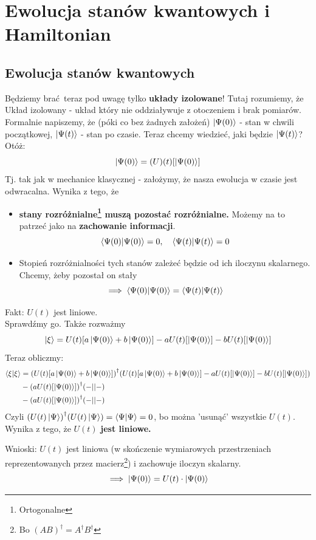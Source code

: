\documentclass[12pt,a4paper]{report}
\newcommand{\ind}[1]{{\color{blue} #1\index{#1}}}
\newcommand{\psket}[1]{\ket{\Psi(#1)}}
\renewcommand{\emph}{\textbf}
\newenvironment{lecture}[1]{\par\medskip
   \noindent\chapter{#1} \rmfamily}{\medskip}
\begin{document}
\begin{lecture}{Ewolucja stanów kwantowych i Hamiltonian}
\section{Ewolucja stanów kwantowych}
Będziemy brać teraz pod uwagę tylko \emph{układy izolowane}! Tutaj rozumiemy, że \ind{Układ izolowany} - układ który nie oddziaływuje z otoczeniem i brak pomiarów.\\
Formalnie napiszemy, że (póki co bez żadnych założeń) $\ket{\Psi(0)}$ - stan w chwili początkowej, $\ket{\Psi(t)}$ - stan po czasie. Teraz chcemy wiedzieć, jaki będzie $\ket{\Psi(t)}$?
Otóż:
\[
    \ket{\Psi(0)} = \mathcal(U)(t)\qty[\ket{\Psi(0)}]
\]
Tj. tak jak w mechanice klasycznej - założymy, że nasza ewolucja w czasie jest odwracalna. Wynika z tego, że 
\begin{itemize}
    \item \emph{stany rozróżnialne\footnote{Ortogonalne} muszą pozostać rozróżnialne.} Możemy na to patrzeć jako na \emph{zachowanie informacji}.
    \[
        \braket{\Psi(0)} = 0 \qc \braket{\Psi(t)} = 0
    \]
    \item Stopień rozróżnialności tych stanów zależeć będzie od ich iloczynu skalarnego. Chcemy, żeby pozostał on stały $$\implies \braket{\Psi(0)} = \braket{\Psi(t)}$$
\end{itemize}

{\color{teal} Fakt}: $U(t)$ jest liniowe.\\
Sprawdźmy go. Także rozważmy $$\ket{\xi} = U(t)\qty[a \ket{\Psi(0)} + b \ket{\Psi(0)}] - a U(t)\qty[\ket{\Psi(0)}] - b U(t)\qty[\ket{\Psi(0)}]$$
Teraz obliczmy:
\begin{align*}
    \braket{\xi} &= \qty(U(t) \qty[a \psket{0} + b \psket{0}])^\dagger \qty( U(t) \qty[a \ket{\Psi(0)} + b \ket{\Psi(0)}] - a U(t) \qty[\ket{\Psi(0)}] - b U(t) \qty[\ket{\Psi(0)}])\\
    &- \qty(a U(t) \qty[\psket{0}])^\dagger \qty(-||-)\\
    &- \qty(a U(t) \qty[\psket{0}])^\dagger \qty(-||-)
\end{align*}
Czyli $\qty(U(t)\ket{\Psi})^\dagger (U(t) \ket{\Psi}) = \braket{\Psi} = 0$, bo można 'usunąć' wszystkie $U(t)$. Wynika z tego, że $U(t)$ \emph{jest liniowe.}

{\color{teal} Wnioski}: $U(t)$ jest liniowa (w skończenie wymiarowych przestrzeniach reprezentowanych przez macierz\footnote{Bo $(AB)^\dagger = A^\dagger B^\dagger$}) i zachowuje iloczyn skalarny.
\[
    \implies \psket{0} = U(t) \cdot \psket{0}
\]


\end{lecture}
\end{document}
